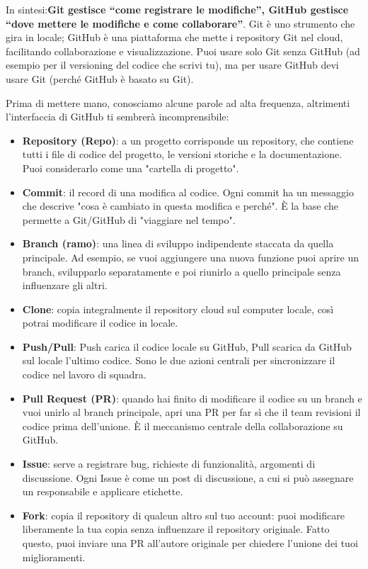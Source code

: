 In sintesi:\textbf{Git gestisce “come registrare le modifiche”, GitHub gestisce “dove mettere le modifiche e come collaborare”}. Git è uno strumento che gira in locale; GitHub è una piattaforma che mette i repository Git nel cloud, facilitando collaborazione e visualizzazione. Puoi usare solo Git senza GitHub (ad esempio per il versioning del codice che scrivi tu), ma per usare GitHub devi usare Git (perché GitHub è basato su Git).



Prima di mettere mano, conosciamo alcune parole ad alta frequenza, altrimenti l'interfaccia di GitHub ti sembrerà incomprensibile:

\begin{itemize}
  \item \textbf{Repository (Repo)}: a un progetto corrisponde un repository, che contiene tutti i file di codice del progetto, le versioni storiche e la documentazione. Puoi considerarlo come una "cartella di progetto".
  \item \textbf{Commit}: il record di una modifica al codice. Ogni commit ha un messaggio che descrive "cosa è cambiato in questa modifica e perché". È la base che permette a Git/GitHub di "viaggiare nel tempo".
  \item \textbf{Branch (ramo)}: una linea di sviluppo indipendente staccata da quella principale. Ad esempio, se vuoi aggiungere una nuova funzione puoi aprire un branch, svilupparlo separatamente e poi riunirlo a quello principale senza influenzare gli altri.
  \item \textbf{Clone}: copia integralmente il repository cloud sul computer locale, così potrai modificare il codice in locale.
  \item \textbf{Push/Pull}: Push carica il codice locale su GitHub, Pull scarica da GitHub sul locale l'ultimo codice. Sono le due azioni centrali per sincronizzare il codice nel lavoro di squadra.
  \item \textbf{Pull Request (PR)}: quando hai finito di modificare il codice su un branch e vuoi unirlo al branch principale, apri una PR per far sì che il team revisioni il codice prima dell'unione. È il meccanismo centrale della collaborazione su GitHub.
  \item \textbf{Issue}: serve a registrare bug, richieste di funzionalità, argomenti di discussione. Ogni Issue è come un post di discussione, a cui si può assegnare un responsabile e applicare etichette.
  \item \textbf{Fork}: copia il repository di qualcun altro sul tuo account: puoi modificare liberamente la tua copia senza influenzare il repository originale. Fatto questo, puoi inviare una PR all'autore originale per chiedere l'unione dei tuoi miglioramenti.
\end{itemize}

